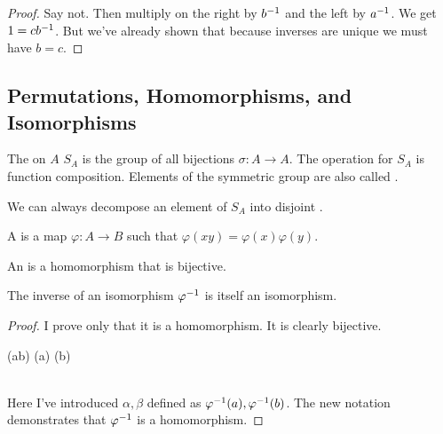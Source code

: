 \begin{proof}
  Say not. Then multiply on the right by ${b}^{-1}$ and the left by
  ${a}^{-1}$. We get $1 = c {b}^{-1}$. But we've already shown that
  because inverses are unique we must have $b = c$.
\end{proof}

\subsection{Permutations, Homomorphisms, and Isomorphisms}

\begin{definition}
  The  on $A$ $S_A$ is the group of all
  bijections $\sigma: A \to A$. The operation for $S_A$ is function
  composition. Elements of the symmetric group are also called
  .
\end{definition}

\begin{proposition}
  We can always decompose an element of $S_A$ into disjoint
  .
\end{proposition}

\begin{definition}
  A  is a map $\varphi: A \to B$ such that
  $\varphi(xy) = \varphi(x) \varphi(y)$.

  An  is a homomorphism that is bijective.
\end{definition}

\begin{proposition}
  The inverse of an isomorphism ${\varphi}^{-1}$ is itself an
  isomorphism.
\end{proposition}

\begin{proof}
  I prove only that it is a homomorphism. It is clearly bijective.

  \begin{nedqn}
    \varphi(ab)
  \eqcol
    \varphi(a) \varphi(b)
  \\
    \inv{\varphi}
  \eqcol
    \inv{\varphi}
  \\
    \alpha \beta
  \eqcol
    \inv{\varphi}\parens{\alpha \beta}
  \end{nedqn}

  \noindent
  Here I've introduced $\alpha, \beta$ defined as ${\varphi}^{-1}(a),
  {\varphi}^{-1}(b)$. The new notation demonstrates that ${\varphi}^{-1}$ is
  a homomorphism.
\end{proof}

